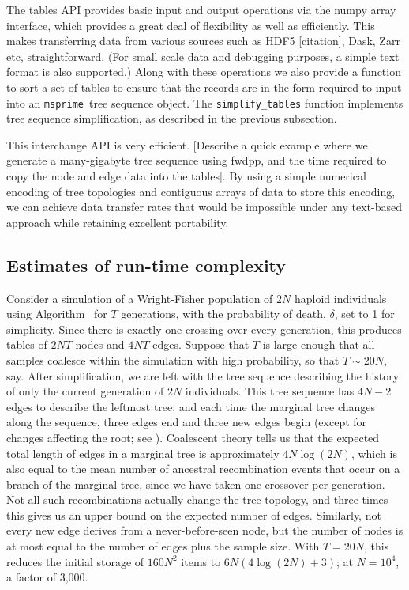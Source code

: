 \documentclass{article}
\newcommand{\msprime}{\texttt{msprime}}
\begin{document}
The tables API provides basic input and output operations via the numpy
array interface, which provides a great deal of flexibility as well
as efficiently. This makes transferring data from various sources
such as HDF5 [citation], Dask, Zarr etc, straightforward. (For small
scale data and debugging purposes, a simple text format is also supported.)
Along with
these operations we also provide a function to sort a set of tables
to ensure that the records are in the form required to input
into an \msprime\ tree sequence object. The \texttt{simplify\_tables}
function implements tree sequence simplification, as described in the
previous subsection.

This interchange API is very efficient. [Describe a quick example where we generate
a many-gigabyte tree sequence using fwdpp, and the time required
to copy the node and edge data into the tables]. By using a simple numerical
encoding of tree topologies and contiguous arrays of data to store this
encoding, we can achieve data transfer rates that would be impossible under
any text-based approach while retaining excellent portability.

\subsection*{Estimates of run-time complexity}

Consider a simulation of a Wright-Fisher population of $2N$ haploid individuals 
using Algorithm~
for $T$ generations,
with the probability of death, $\delta$, set to 1 for simplicity.
Since there is exactly one crossing over every generation,
this produces tables of 
$2NT$ nodes and
$4NT$ edges.
Suppose that $T$ is large enough that all samples coalesce within the simulation with high probability,
so that $T \sim 20N$, say.
After simplification, we are left with the tree sequence describing the history
of only the current generation of $2N$ individuals.
This tree sequence has $4N-2$ edges to describe the leftmost tree;
and each time the marginal tree changes along the sequence,
three edges end and three new edges begin (except for changes affecting the root; see \citet{kelleher2016efficient}).
Coalescent theory tells us that 
the expected total length of edges in a marginal tree is approximately $4N\log(2N)$,
which is also equal to the mean number of ancestral recombination events that occur on a branch of the marginal tree,
since we have taken one crossover per generation.
Not all such recombinations actually change the tree topology,
and three times this gives us an upper bound on the expected number of edges.
Similarly, not every new edge derives from a never-before-seen node,
but the number of nodes is at most equal to the number of edges plus the sample size.
With $T=20N$, this reduces the initial storage of $160 N^2$ items to $6N(4\log(2N) + 3)$;
at $N=10^4$, a factor of 3,000.
\end{document}
